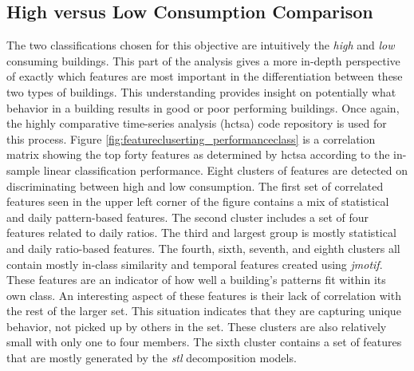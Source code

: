 \subsection{High versus Low Consumption Comparison}
\label{sec:highvslow}

The two classifications chosen for this objective are intuitively the \emph{high} and \emph{low} consuming buildings. This part of the analysis gives a more in-depth perspective of exactly which features are most important in the differentiation between these two types of buildings. This understanding provides insight on potentially what behavior in a building results in good or poor performing buildings. Once again, the highly comparative time-series analysis (hctsa) code repository is used for this process. Figure \ref{fig:featurecluserting_performanceclass} is a correlation matrix showing the top forty features as determined by hctsa according to the in-sample linear classification performance. Eight clusters of features are detected on discriminating between high and low consumption. The first set of correlated features seen in the upper left corner of the figure contains a mix of statistical and daily pattern-based features. The second cluster includes a set of four features related to daily ratios. The third and largest group is mostly statistical and daily ratio-based features. The fourth, sixth, seventh, and eighth clusters all contain mostly in-class similarity and temporal features created using \emph{jmotif}. These features are an indicator of how well a building's patterns fit within its own class. An interesting aspect of these features is their lack of correlation with the rest of the larger set. This situation indicates that they are capturing unique behavior, not picked up by others in the set. These clusters are also relatively small with only one to four members. The sixth cluster contains a set of features that are mostly generated by the \emph{stl} decomposition models.

